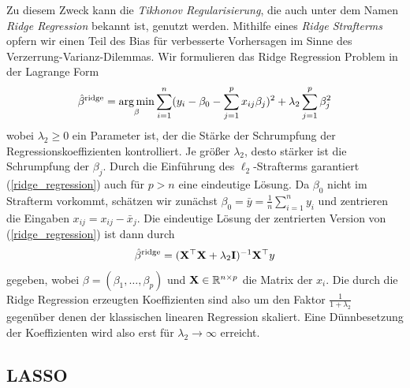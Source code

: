 Zu diesem Zweck kann die \textit{Tikhonov Regularisierung}, die auch unter dem Namen \textit{Ridge Regression} bekannt ist, genutzt werden. Mithilfe eines \textit{Ridge Strafterms} opfern wir einen Teil des Bias für verbesserte Vorhersagen im Sinne des Verzerrung-Varianz-Dilemmas. Wir formulieren das Ridge Regression Problem in der Lagrange Form
\begin{align}
\label{ridge_regression}
\hat{\beta}^{\text{ridge}} = \operatorname*{arg\,min}_{\beta} \sum_{i=1}^{n}(y_i - \beta_0 - \sum_{j=1}^p x_{ij}\beta_j)^2 + \lambda_2\sum_{j=1}^p \beta_j^2
\end{align}
wobei $\lambda_2 \geq 0$ ein Parameter ist, der die Stärke der Schrumpfung der Regressionskoeffizienten kontrolliert. Je größer $\lambda_2$, desto stärker ist die Schrumpfung der $\beta_j$. Durch die Einführung des $\ell_2$-Strafterms garantiert (\ref{ridge_regression}) auch für $p > n$ eine eindeutige Lösung. Da $\beta_0$ nicht im Strafterm vorkommt, schätzen wir zunächst $\beta_0 = \bar{y} = \frac{1}{n}\sum_{i=1}^{n} y_i$ und zentrieren die Eingaben $x_{ij} = x_{ij} - \bar{x}_j$. Die eindeutige Lösung der zentrierten Version von (\ref{ridge_regression}) ist dann durch
\begin{align}
\hat{\beta}^{\text{ridge}}  = (\mathbf{X}^{\top} \mathbf{X} + \lambda_2\mathbf{I})^{-1}\mathbf{X}^{\top}y
\end{align}
gegeben, wobei $\beta = (\beta_1, \ldots, \beta_p)$ und $\mathbf{X} \in \mathbb{R}^{n \times p}$ die Matrix der $x_i$. Die durch die Ridge Regression erzeugten Koeffizienten sind also um den Faktor $\frac{1}{1+\lambda_2}$ gegenüber denen der klassischen linearen Regression skaliert. Eine Dünnbesetzung der Koeffizienten wird also erst für $\lambda_2 \to \infty$ erreicht.

\subsection{LASSO}
\label{lasso}

